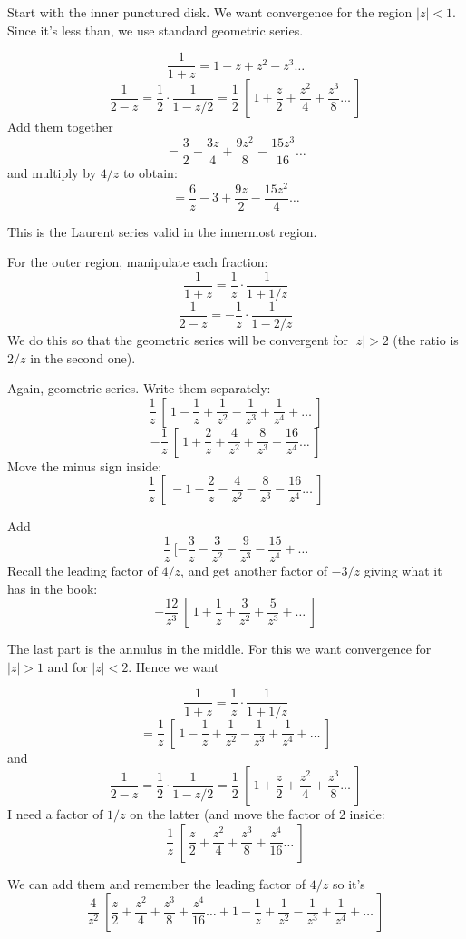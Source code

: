 \documentclass[11pt, oneside]{article}
\begin{document}
Start with the inner punctured disk.  We want convergence for the region $|z| < 1$.  Since it's less than, we use standard geometric series.

\[ \frac{1}{1 + z} = 1 - z + z^2 - z^3 \dots \]
\[ \frac{1}{2 - z} = \frac{1}{2} \cdot \frac{1}{1 - z/2} = \frac{1}{2} \ [ \ 1 + \frac{z}{2} + \frac{z^2}{4} + \frac{z^3}{8} \dots \ ] \]
Add them together 
\[ = \frac{3}{2} - \frac{3z}{4} +  \frac{9z^2}{8} - \frac{15z^3}{16} \dots \]
and multiply by $4/z$ to obtain:
\[ = \frac{6}{z} - 3 + \frac{9z}{2} - \frac{15z^2}{4} \dots \]

This is the Laurent series valid in the innermost region.

For the outer region, manipulate each fraction:
\[ \frac{1}{1 + z} = \frac{1}{z} \cdot \frac{1}{1 + 1/z} \]
\[ \frac{1}{2 - z} = -\frac{1}{z} \cdot \frac{1}{1 - 2/z} \]
We do this so that the geometric series will be convergent for $|z| > 2$ (the ratio is $2/z$ in the second one).

Again, geometric series.  Write them separately:
\[ \frac{1}{z} \ [ \ 1 - \frac{1}{z} + \frac{1}{z^2} - \frac{1}{z^3} + \frac{1}{z^4} + \dots \ ] \]
\[ -\frac{1}{z} \ [ \ 1 + \frac{2}{z} + \frac{4}{z^2} + \frac{8}{z^3} + \frac{16}{z^4} \dots \ ] \]
Move the minus sign inside:
\[ \frac{1}{z} \ [ \ -1 - \frac{2}{z} - \frac{4}{z^2} - \frac{8}{z^3} - \frac{16}{z^4} \dots \ ] \]

Add
\[ \frac{1}{z} \ [  -\frac{3}{z} - \frac{3}{z^2} - \frac{9}{z^3} - \frac{15}{z^4} + \dots \]
Recall the leading factor of $4/z$, and get another factor of $-3/z$ giving what it has in the book:
\[ -\frac{12}{z^3} \ [ \ 1 + \frac{1}{z} + \frac{3}{z^2} + \frac{5}{z^3} + \dots \ ] \]

The last part is the annulus in the middle.  For this we want convergence for $|z| > 1$ and for $|z| < 2$.  Hence we want 

\[ \frac{1}{1 + z} = \frac{1}{z} \cdot \frac{1}{1 + 1/z} \]
\[ = \frac{1}{z} \ [ \ 1  -\frac{1}{z} + \frac{1}{z^2} - \frac{1}{z^3} + \frac{1}{z^4} + \dots \ ] \]
and 
\[ \frac{1}{2 - z} = \frac{1}{2} \cdot \frac{1}{1 - z/2} = \frac{1}{2} \ [ \ 1 + \frac{z}{2} + \frac{z^2}{4} + \frac{z^3}{8} \dots \ ] \]
I need a factor of $1/z$ on the latter (and move the factor of $2$ inside:
\[ \frac{1}{z} \ [ \ \frac{z}{2} + \frac{z^2}{4} + \frac{z^3}{8} + \frac{z^4}{16} \dots \ ] \]

We can add them and remember the leading factor of $4/z$ so it's
\[ \frac{4}{z^2} \ [ \frac{z}{2} + \frac{z^2}{4} + \frac{z^3}{8} + \frac{z^4}{16} \dots + 1  -\frac{1}{z} + \frac{1}{z^2} - \frac{1}{z^3} + \frac{1}{z^4} + \dots \ ] \]
\end{document}
